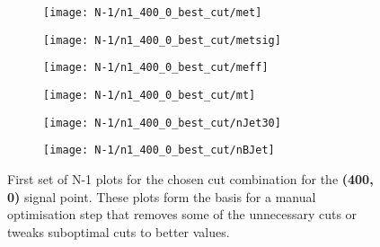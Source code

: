 \begin{figure}
	\centering
	\begin{subfigure}[b]{0.5\linewidth}
		\centering\texttt{[image: N-1/n1\_400\_0\_best\_cut/met]}
		\caption{\label{fig:result_400_0_met}}
	\end{subfigure}%
	\begin{subfigure}[b]{0.5\linewidth}
		\centering\texttt{[image: N-1/n1\_400\_0\_best\_cut/metsig]}
		\caption{\label{fig:result_400_0_metsig}}
	\end{subfigure}
	\begin{subfigure}[b]{0.5\linewidth}
		\centering\texttt{[image: N-1/n1\_400\_0\_best\_cut/meff]}
		\caption{\label{fig:result_400_0_meff}}
	\end{subfigure}%
	\begin{subfigure}[b]{0.5\linewidth}
		\centering\texttt{[image: N-1/n1\_400\_0\_best\_cut/mt]}
		\caption{\label{fig:result_400_0_mt}}
	\end{subfigure}
	\begin{subfigure}[b]{0.5\linewidth}
		\centering\texttt{[image: N-1/n1\_400\_0\_best\_cut/nJet30]}
		\caption{\label{fig:result_400_0_njet}}
	\end{subfigure}%
	\begin{subfigure}[b]{0.5\linewidth}
		\centering\texttt{[image: N-1/n1\_400\_0\_best\_cut/nBJet]}
		\caption{\label{fig:result_400_0_nbjet}}
	\end{subfigure}
	\caption[N-1 plots for the chosen cut combination for the (400,0) signal point, 1/2]{First set of N-1 plots for the chosen cut combination for the \textbf{(400, 0)} signal point. These plots form the basis for a manual optimisation step that removes some of the unnecessary cuts or tweaks suboptimal cuts to better values.}
	\label{fig:results_400_0_n-1_1}
\end{figure}

